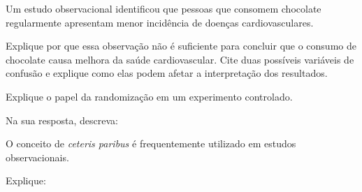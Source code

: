\documentclass[a4paper, 12pt, addpoints]{exam}
\begin{document}
\info\vspace{-1.2 cm} %
\begin{center}
\scalebox{0.923}{
	\gradetable[h]
}
\end{center}

\begin{questions}
	
	\question[1]
	Um estudo observacional identificou que pessoas que consomem chocolate regularmente apresentam menor incidência de doenças cardiovasculares.
	
	Explique por que essa observação não é suficiente para concluir que o consumo de chocolate causa melhora da saúde cardiovascular. Cite duas possíveis variáveis de confusão e explique como elas podem afetar a interpretação dos resultados.
	
	\question[1]
	
	Explique o papel da randomização em um experimento controlado.
	
	Na sua resposta, descreva:
	
	
	\question[1]
	
	O conceito de \textit{ceteris paribus} é frequentemente utilizado em estudos observacionais.
	
	Explique:
	
\end{questions}
\end{document}
